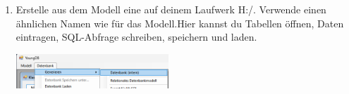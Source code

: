 \begin{enumerate}
    \item Erstelle aus dem Modell eine  auf deinem Laufwerk H:/. Verwende einen ähnlichen Namen wie für das Modell.Hier kannst du Tabellen öffnen, Daten eintragen, SQL-Abfrage schreiben, speichern und laden.
    
    \includegraphics[width=0.45\textwidth]{img/YDB_dbGenerieren.png}
\end{enumerate}



